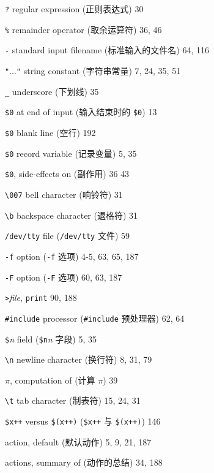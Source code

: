 \begin{multicols}{3}
\hangindent=3pc  \verb'?' regular expression (正则表达式) 30

\hangindent=3pc  \verb'%' remainder operator (取余运算符) 36, 46

\hangindent=3pc  \verb'-' standard input filename
(标准输入的文件名) 64, 116

\hangindent=3pc  \verb'"'...\verb'"' string constant
(字符串常量) 7, 24, 35, 51

\hangindent=3pc  \verb'_' underscore (下划线) 35

\hangindent=3pc  \verb'$0' at end of input (输入结束时的
\verb'$0') 13

\hangindent=3pc  \verb'$0' blank line (空行) 192

\hangindent=3pc  \verb'$0' record variable (记录变量) 5, 35

\hangindent=3pc  \verb'$0', side-effects on (副作用) 36 43

\hangindent=3pc  \verb'\007' bell character (响铃符) 31

\hangindent=3pc  \verb'\b' backspace character (退格符) 31

\hangindent=3pc  \verb'/dev/tty' file (\verb'/dev/tty' 文件) 59

\hangindent=3pc  \verb'-f' option (\verb'-f' 选项) 4-5, 63, 65, 187

\hangindent=3pc  \verb'-F' option (\verb'-F' 选项) 60, 63, 187

\hangindent=3pc  \verb'>'\textit{file}, \verb'print' 90, 188

\hangindent=3pc  \verb'#include' processor (\verb'#include'
预处理器) 62, 64

\hangindent=3pc  \verb'$'\textit{n} field (\verb'$n'\textit{n}
字段) 5, 35

\hangindent=3pc  \verb'\n' newline character (换行符) 8, 31, 79

\hangindent=3pc  $\pi$, computation of (计算 $\pi$) 39

\hangindent=3pc  \verb'\t' tab character (制表符) 15, 24, 31

\hangindent=3pc  \verb'$x++' versus \verb'$(x++)' (\verb'$x++'
与 \verb'$(x++)') 146

\hangindent=3pc  action, default (默认动作) 5, 9, 21, 187

\hangindent=3pc  actions, summary of (动作的总结) 34, 188


\end{multicols}
